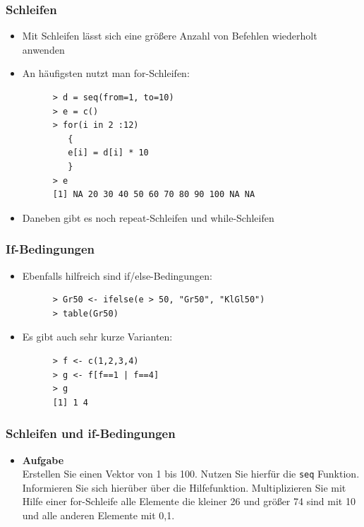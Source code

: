\documentclass{beamer}
\begin{document}
\begin{frame}[fragile]
  \frametitle{Schleifen}
  \begin{itemize}
    \item Mit Schleifen lässt sich eine größere Anzahl von Befehlen wiederholt anwenden
    \item An häufigsten nutzt man for-Schleifen:
    \begin{Verbatim}
      > d = seq(from=1, to=10)
      > e = c()
      > for(i in 2 :12)
         {
         e[i] = d[i] * 10
         }
      > e
      [1] NA 20 30 40 50 60 70 80 90 100 NA NA  
 \end{Verbatim}
    \item Daneben gibt es noch repeat-Schleifen und while-Schleifen
  \end{itemize}
\end{frame}

\begin{frame}[fragile]
  \frametitle{If-Bedingungen}
  \begin{itemize}
\item Ebenfalls hilfreich sind if/else-Bedingungen:
     \begin{Verbatim}
      > Gr50 <- ifelse(e > 50, "Gr50", "KlGl50")
      > table(Gr50)
    \end{Verbatim}   
\item Es gibt auch sehr kurze Varianten:
     \begin{Verbatim}
      > f <- c(1,2,3,4)
      > g <- f[f==1 | f==4] 
      > g
      [1] 1 4
    \end{Verbatim}     
  \end{itemize}
\end{frame}

\begin{frame}[fragile]
  \frametitle{Schleifen und if-Bedingungen}
 \begin{itemize}
   \item \textbf{Aufgabe} \\ 
  Erstellen Sie einen Vektor von 1 bis 100. Nutzen Sie hierfür die \Verb+seq+ Funktion. Informieren Sie sich hierüber über die Hilfefunktion. Multiplizieren Sie mit Hilfe einer for-Schleife alle Elemente die kleiner 26 und größer 74 sind mit 10  und alle anderen Elemente mit 0,1.
  \end{itemize}
\end{frame}
\end{document}
